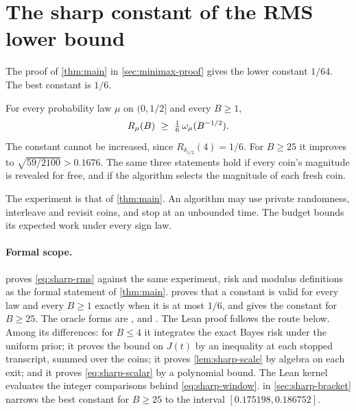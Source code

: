 \section{The sharp constant of the RMS lower bound}
\label{app:sharp-rms}

The proof of \cref{thm:main} in \cref{sec:minimax-proof} gives the lower
constant $1/64$. The best constant is $1/6$.

\begin{theorem}\label{thm:sharp-rms}
For every probability law $\mu$ on $(0,1/2]$ and every $B\ge1$,
\begin{equation}\label{eq:sharp-rms}
 R_\mu(B)\ \ge\ \tfrac16\,\omega_\mu(B^{-1/2}).
\end{equation}
The constant cannot be increased, since $R_{\delta_{1/2}}(4)=1/6$. For
$B\ge25$ it improves to $\sqrt{59/2100}>0.1676$. The same three statements
hold if every coin's magnitude is revealed for free, and if the algorithm
selects the magnitude of each fresh coin.
\end{theorem}

The experiment is that of \cref{thm:main}. An algorithm may use private
randomness, interleave and revisit coins, and stop at an unbounded time.
The budget bounds its expected work under every sign law.

\paragraph{Formal scope.}
 proves \eqref{eq:sharp-rms}
against the same experiment, risk and modulus definitions as the formal
statement of \cref{thm:main}.
 proves that a constant is
valid for every law and every $B\ge1$ exactly when it is at most $1/6$,
and  gives the constant
for $B\ge25$. The oracle forms are
,
 and
. The Lean proof follows the
route below. Among its differences: for $B\le4$ it integrates the exact
Bayes risk under the uniform prior; it proves the bound on $J(t)$ by an
inequality at each stopped transcript, summed over the coins; it proves
\cref{lem:sharp-scale} by algebra on each exit; and it proves
\eqref{eq:sharp-scalar} by a polynomial bound. The Lean kernel evaluates
the integer comparisons behind \eqref{eq:sharp-window}.
 in \cref{sec:sharp-bracket} narrows the best
constant for $B\ge25$ to the interval $[0.175198,0.186752]$.

